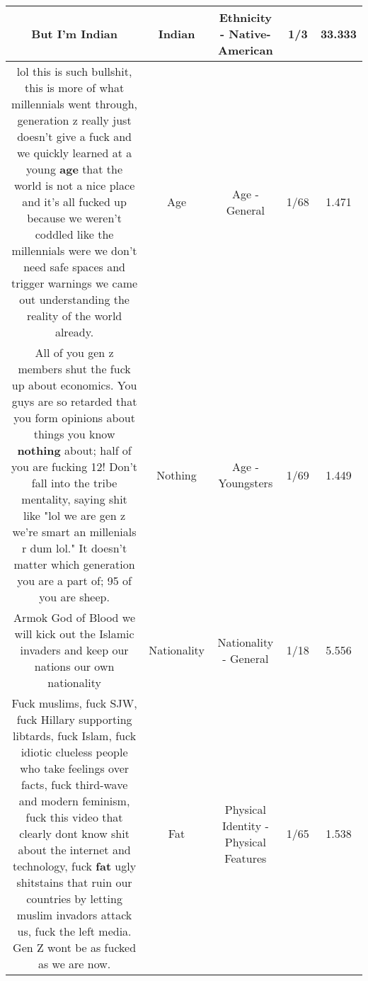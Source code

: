 \documentclass[11pt]{article}
\newlength\mylength
\begin{document}
\begin{center}
\begin{longtable}{|C{.65\mylength}|C{.30\mylength}|C{.12\mylength}|C{.12\mylength}|C{.12\mylength}|}
  \small But I'm Indian\normalsize   & Indian & Ethnicity - Native-American & 1/3 & 33.333 \\  \hline
  \small lol this is such bullshit, this is more of what millennials went through, generation z really just doesn't give a fuck and we quickly learned at a young \textbf{age} that the world is not a nice place and it's all fucked up because we weren't coddled like the millennials were we don't need safe spaces and trigger warnings we came out understanding the reality of the world already.\normalsize   & Age & Age - General & 1/68 & 1.471 \\  \hline
  \small All of you gen z members shut the fuck up about economics. You guys are so retarded that you form opinions about things you know \textbf{nothing} about; half of you are fucking 12! Don't fall into the tribe mentality, saying shit like "lol we are gen z we're smart an millenials r dum lol." It doesn't matter which generation you are a part of; 95 of you are sheep.\normalsize   & Nothing & Age - Youngsters & 1/69 & 1.449 \\  \hline
  \small Armok God of Blood we will kick out the Islamic invaders and keep our nations our own nationality\normalsize   & Nationality & Nationality - General & 1/18 & 5.556 \\  \hline
  \small Fuck muslims, fuck SJW, fuck Hillary supporting libtards, fuck Islam, fuck idiotic clueless people who take feelings over facts, fuck third-wave and modern feminism, fuck this video that clearly dont know shit about the internet and technology, fuck \textbf{fat} ugly shitstains that ruin our countries by letting muslim invadors attack us, fuck the left media. Gen Z wont be as fucked as we are now.\normalsize   & Fat & Physical Identity - Physical Features & 1/65 & 1.538 \\  \hline

\end{longtable}
\end{center}
\end{document}
